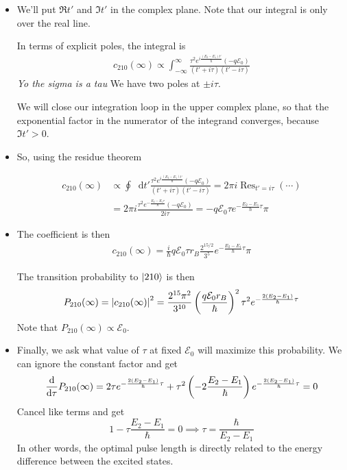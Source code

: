 \documentclass[11pt, a4paper]{article}
\newcommand{\diff}{\mathop{}\!\mathrm{d}} %
\newcommand{\E}{\mathcal{E}}  %
\begin{document}
\begin{itemize}
	\item We'll put $ \Re t' $ and $ \Im t' $ in the complex plane. Note that our integral is only over the real line.
	
	In terms of explicit poles, the integral is
	\begin{align*}
		c_{210}(\infty) \propto \int_{-\infty}^{\infty} \frac{\tau^{2} e^{i\frac{(E_{2}-E_{1})t'}{\hbar}}(-q\E_{0})}{(t' + i \tau)(t' - i \tau)}
	\end{align*}
	\textit{Yo the sigma is a tau} We have two poles at $ \pm i \tau $. 
	
	We will close our integration loop in the upper complex plane, so that the exponential factor in the numerator of the integrand converges, because $ \Im t' > 0 $.
	
	\item So, using the residue theorem
	
	\begin{align*}
		c_{210}(\infty) &\propto \oint \diff t' \frac{\tau^{2} e^{i\frac{(E_{2}-E_{1})t'}{\hbar}}(-q\E_{0})}{(t' + i \tau)(t' - i \tau)} = 2\pi i \operatorname{Res}_{t' = i \tau}(\cdots) \\
		& = 2\pi i \frac{\tau^{2}e^{-\frac{E_{2} - E_{1}\tau}{\hbar}}(- q \E_{0})}{2i \tau} = - q \E_{0}\tau e^{-\frac{E_{2} - E_{1}}{\hbar}\tau} \pi
	\end{align*}
	
	\item The coefficient is then
	\begin{align*}
		c_{210}(\infty) = \frac{i}{\hbar}q \E_{0}\tau r_{B} \frac{2^{15/2}}{3^{5}} e^{-\frac{E_{2} - E_{1}}{\hbar}\tau} \pi
	\end{align*}
	
	The transition probability to $ \ket{210} $ is then
	\begin{equation*}
		P_{210}(\infty) = \abs{c_{210}(\infty)}^{2} = \frac{2^{15}\pi^{2}}{3^{10}}\left(\frac{q\E_{0}r_{B}}{\hbar}\right)^{2} \tau^{2}e^{-\frac{2(E_{2} - E_{1})}{\hbar}\tau}
	\end{equation*}
	Note that $ P_{210}(\infty)  \propto \E_{0} $. 
		
	\item Finally, we ask what value of $ \tau $ at fixed $ \E_{0} $ will maximize this probability. We can ignore the constant factor and get
	\begin{equation*}
		\dv{\tau}P_{210}(\infty) = 2 \tau e^{-\frac{2(E_{2} - E_{1})}{\hbar}\tau} + \tau^{2}\left(-2\frac{E_{2}- E_{1}}{\hbar}\right)e^{-\frac{2(E_{2} - E_{1})}{\hbar}\tau} = 0
	\end{equation*}
	Cancel like terms and get
	\begin{equation*}
		1 - \tau \frac{E_{2}-E_{1}}{\hbar} = 0 \implies \tau = \frac{\hbar}{E_{2} - E_{1}}
	\end{equation*}
	In other words, the optimal pulse length is directly related to the energy difference between the excited states. 
	
\end{itemize}
\end{document}
